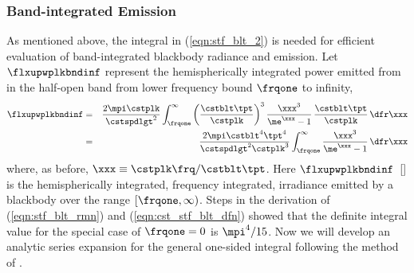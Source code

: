 \documentclass[12pt]{article}
\begin{document}
\subsubsection[Band-integrated Emission]{Band-integrated Emission}\label{sxn:msn}
As mentioned above, the integral in (\ref{eqn:stf_blt_2}) is needed
for efficient evaluation of band-integrated blackbody radiance and
emission.
Let $\flxupwplkbndinf$ represent the hemispherically integrated power
emitted from in the half-open band from lower frequency bound
$\frqone$ to infinity, 
\begin{eqnarray}
\flxupwplkbndinf
& = & \frac{2 \mpi \cstplk}{\cstspdlgt^{2}} 
\int_{\frqone}^{\infty} 
\left( \frac{\cstblt \tpt}{\cstplk} \right)^{3}
\frac{\xxx^{3}}{\me^{\xxx} - 1} \, \frac{\cstblt \tpt}{\cstplk} \,\dfr\xxx
\nonumber \\
& = & \frac{2 \mpi \cstblt^{4} \tpt^{4} }{\cstspdlgt^{2} \cstplk^{3}} 
\int_{\frqone}^{\infty} 
\frac{\xxx^{3}}{\me^{\xxx} - 1} \,\dfr\xxx
\label{eqn:plk_ntg_frq}
\end{eqnarray}
where, as before, $\xxx \equiv \cstplk \frq/\cstblt \tpt$.
Here $\flxupwplkbndinf$~[\wxmS] is the hemispherically integrated,
frequency integrated, irradiance emitted by a blackbody over the range 
$[\frqone,\infty)$.
Steps in the derivation of (\ref{eqn:stf_blt_rmn}) and (\ref{eqn:cst_stf_blt_dfn}) showed that the definite integral value for the special case of $\frqone=0$ is $\mpi^{4}/15$.
Now we will develop an analytic series expansion for the general one-sided
integral following the method of \cite{WiW76}.
\end{document}
